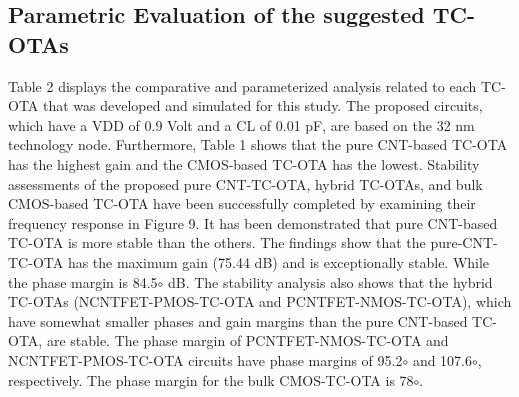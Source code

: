 \subsection*{Parametric Evaluation of the suggested TC-OTAs}

Table 2 displays the comparative and parameterized analysis related to each
TC-OTA that was developed and simulated for this study. The proposed circuits,
which have a VDD of 0.9 Volt and a CL of 0.01 pF, are based on the 32 nm
technology node. Furthermore, Table 1 shows that the pure CNT-based TC-OTA has
the highest gain and the CMOS-based TC-OTA has the lowest. Stability assessments
of the proposed pure CNT-TC-OTA, hybrid TC-OTAs, and bulk CMOS-based TC-OTA have
been successfully completed by examining their frequency response in Figure 9.
It has been demonstrated that pure CNT-based TC-OTA is more stable than the
others. The findings show that the pure-CNT-TC-OTA has the maximum gain (75.44
dB) and is exceptionally stable. While the phase margin is 84.5$\circ$ dB. The
stability analysis also shows that the hybrid TC-OTAs (NCNTFET-PMOS-TC-OTA and
PCNTFET-NMOS-TC-OTA), which have somewhat smaller phases and gain margins than
the pure CNT-based TC-OTA, are stable. The phase margin of PCNTFET-NMOS-TC-OTA
and NCNTFET-PMOS-TC-OTA circuits have phase margins of 95.2$\circ$ and
107.6$\circ$, respectively. The phase margin for the bulk CMOS-TC-OTA is
78$\circ$.

